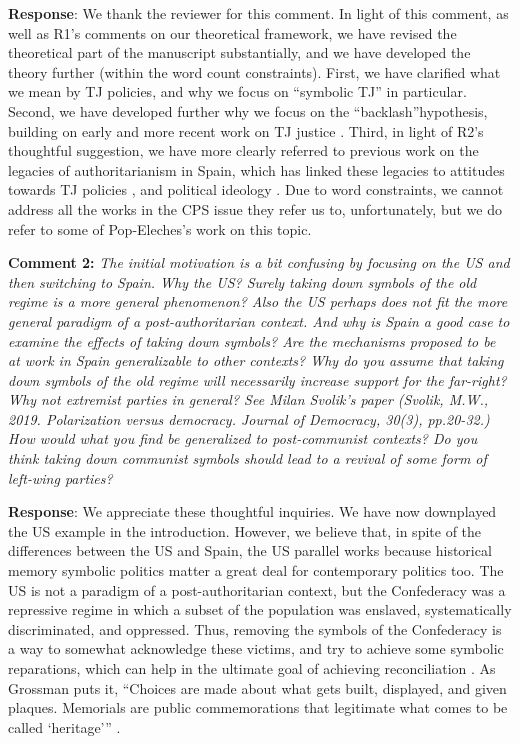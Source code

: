 \documentclass[12pt, a4paper, notitlepage]{article}
\begin{document}
\textbf{Response}: We thank the reviewer for this comment. In light of this comment, as well as R1's comments on our theoretical framework, we have revised the theoretical part of the manuscript substantially, and we have developed the theory further (within the word count constraints). First, we have clarified what we mean by TJ policies, and why we focus on ``symbolic TJ'' in particular. Second, we have developed further why we focus on the ``backlash''hypothesis, building on early and more recent work on TJ justice \citep{Elster:2004aa, Capoccia:2020aa, Balcells:2020aa}. Third, in light of R2's thoughtful suggestion, we have more clearly referred to previous work on the legacies of authoritarianism in Spain, which has linked these legacies to attitudes towards TJ policies \citep{Aguilar:2002aa, Aguilar:2011aa}, and political ideology \citep{Balcells:2012aa}. Due to word constraints, we cannot address all the works in the CPS issue they refer us to, unfortunately, but we do refer to some of Pop-Eleches's work on this topic.

\textbf{Comment 2:} \textit{The initial motivation is a bit confusing by focusing on the US and then switching to Spain. Why the US? Surely taking down symbols of the old regime is a more general phenomenon? Also the US perhaps does not fit the more general paradigm of a post-authoritarian context. And why is Spain a good case to examine the effects of taking down symbols? Are the mechanisms proposed to be at work in Spain generalizable to other contexts? Why do you assume that taking down symbols of the old regime will necessarily increase support for the far-right? Why not extremist parties in general? See Milan Svolik’s paper (Svolik, M.W., 2019. Polarization versus democracy. Journal of Democracy, 30(3), pp.20-32.) How would what you find be generalized to post-communist contexts? Do you think taking down communist symbols should lead to a revival of some form of left-wing parties?}

\textbf{Response}: We appreciate these thoughtful inquiries. We have now downplayed the US example in the introduction. However, we believe that, in spite of the differences between the US and Spain, the US parallel works because historical memory symbolic politics matter a great deal for contemporary politics too. The US is not a paradigm of a post-authoritarian context, but the Confederacy was a repressive regime in which a subset of the population was enslaved, systematically discriminated, and oppressed. Thus, removing the symbols of the Confederacy is a way to somewhat acknowledge these victims, and try to achieve some symbolic reparations, which can help in the ultimate goal of achieving reconciliation \citep{Walsh2020, Ward2021}. As Grossman puts it, ``Choices are made about what gets built, displayed, and given plaques. Memorials are public commemorations that legitimate what comes to be called `heritage''' \citep{Grossman:2016}.
\end{document}
